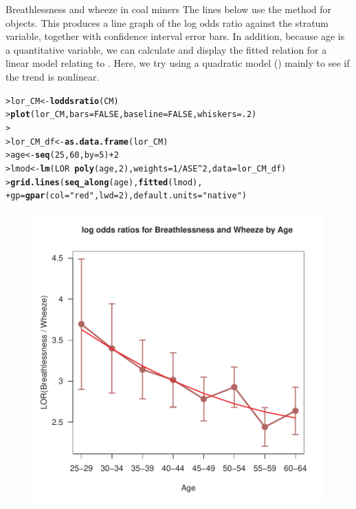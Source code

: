 \documentclass[10pt,krantz2]{krantz}\usepackage[]{graphicx}\usepackage[]{color}
\makeatletter
\newcommand{\hlnum}[1]{\textcolor[rgb]{0.686,0.059,0.569}{#1}}%
\newcommand{\hlstr}[1]{\textcolor[rgb]{0.192,0.494,0.8}{#1}}%
\newcommand{\hlopt}[1]{\textcolor[rgb]{0,0,0}{#1}}%
\newcommand{\hlstd}[1]{\textcolor[rgb]{0.345,0.345,0.345}{#1}}%
\newcommand{\hlkwb}[1]{\textcolor[rgb]{0.69,0.353,0.396}{#1}}%
\newcommand{\hlkwc}[1]{\textcolor[rgb]{0.333,0.667,0.333}{#1}}%
\newcommand{\hlkwd}[1]{\textcolor[rgb]{0.737,0.353,0.396}{\textbf{#1}}}%
\newenvironment{kframe}{%
 \def\at@end@of@kframe{}%
 \ifinner\ifhmode%
  \def\at@end@of@kframe{\end{minipage}}%
  \begin{minipage}{\columnwidth}%
 \fi\fi%
 \def\FrameCommand##1{\hskip\@totalleftmargin \hskip-\fboxsep
 \colorbox{shadecolor}{##1}\hskip-\fboxsep
     \hskip-\linewidth \hskip-\@totalleftmargin \hskip\columnwidth}%
 \MakeFramed {\advance\hsize-\width
   \@totalleftmargin\z@ \linewidth\hsize
   \@setminipage}}%
 {\par\unskip\endMakeFramed%
 \at@end@of@kframe}
\newenvironment{knitrout}{}{} %
\renewenvironment{knitrout}{\small\renewcommand{\baselinestretch}{.85}}{} %
\makeatother
\begin{document}
\begin{Example}[wheeze1]{Breathlessness and wheeze in coal miners}
The lines below
use the  method for  objects.
This produces a line graph of the log odds ratio against the
stratum variable, together with confidence interval error bars.
In addition, because age is a quantitative variable, we can
calculate and display the fitted relation for a linear model
relating  to .  Here, we try using a
quadratic model () mainly to see if the
trend is nonlinear.
\begin{knitrout}
\color{fgcolor}\begin{kframe}
\begin{alltt}
\hlstd{> }\hlstd{lor_CM} \hlkwb{<-} \hlkwd{loddsratio}\hlstd{(CM)}
\hlstd{> }\hlkwd{plot}\hlstd{(lor_CM,} \hlkwc{bars}\hlstd{=}\hlnum{FALSE}\hlstd{,} \hlkwc{baseline}\hlstd{=}\hlnum{FALSE}\hlstd{,} \hlkwc{whiskers}\hlstd{=}\hlnum{.2}\hlstd{)}
\hlstd{> }
\hlstd{> }\hlstd{lor_CM_df} \hlkwb{<-} \hlkwd{as.data.frame}\hlstd{(lor_CM)}
\hlstd{> }\hlstd{age} \hlkwb{<-} \hlkwd{seq}\hlstd{(}\hlnum{25}\hlstd{,} \hlnum{60}\hlstd{,} \hlkwc{by} \hlstd{=} \hlnum{5}\hlstd{)} \hlopt{+} \hlnum{2}
\hlstd{> }\hlstd{lmod} \hlkwb{<-} \hlkwd{lm}\hlstd{(LOR} \hlopt{~} \hlkwd{poly}\hlstd{(age,} \hlnum{2}\hlstd{),} \hlkwc{weights} \hlstd{=} \hlnum{1} \hlopt{/} \hlstd{ASE}\hlopt{^}\hlnum{2}\hlstd{,} \hlkwc{data} \hlstd{= lor_CM_df)}
\hlstd{> }\hlkwd{grid.lines}\hlstd{(}\hlkwd{seq_along}\hlstd{(age),} \hlkwd{fitted}\hlstd{(lmod),}
\hlstd{+ }           \hlkwc{gp} \hlstd{=} \hlkwd{gpar}\hlstd{(}\hlkwc{col} \hlstd{=} \hlstr{"red"}\hlstd{,} \hlkwc{lwd} \hlstd{=} \hlnum{2}\hlstd{),} \hlkwc{default.units} \hlstd{=} \hlstr{"native"}\hlstd{)}
\end{alltt}
\end{kframe}\begin{figure}[!htbp]

\centerline{\includegraphics[width=.6\textwidth]{ch04/fig/coalminer3-1} }


\end{figure}
\end{knitrout}
\end{Example}
\end{document}
